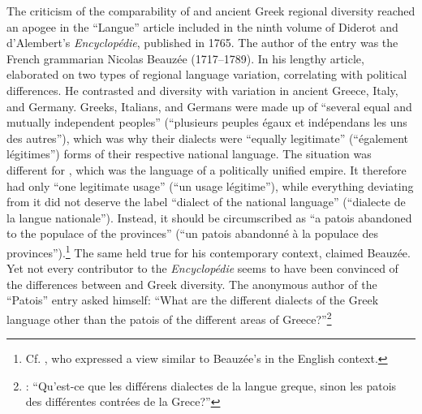 The criticism of the comparability of  and ancient Greek regional diversity reached an apogee in the “Langue” article included in the ninth volume of Diderot and d’Alembert’s \textit{Encyclopédie}, published in 1765. The author of the entry was the French grammarian Nicolas Beauzée (1717–1789). In his lengthy article, \citet[249]{Beauzee1765} elaborated on two types of regional language variation, correlating with political differences. He contrasted  and  diversity with variation in ancient Greece, Italy, and Germany. Greeks, Italians, and Germans were made up of “several equal and mutually independent peoples” (“plusieurs peuples égaux et indépendans les uns des autres”), which was why their dialects were “equally legitimate” (“également légitimes”) forms of their respective national language. The situation was different for , which was the language of a politically unified empire. It therefore had only “one legitimate usage” (“un usage légitime”), while everything deviating from it did not deserve the label “dialect of the national language” (“dialecte de la langue nationale”). Instead, it should be circumscribed as “a patois abandoned to the populace of the provinces” (“un patois abandonné à la populace des provinces”).\footnote{Cf. \citet[135--136]{Priestley1762}, who expressed a view similar to Beauzée’s in the English context.} The same held true for his contemporary  context, claimed Beauzée. Yet not every contributor to the \textit{Encyclopédie} seems to have been convinced of the differences between  and Greek diversity. The anonymous author of the “Patois” entry asked himself: “What are the different dialects of the Greek language other than the patois of the different areas of Greece?”\footnote{\citet[174]{Anon.1765}: “Qu’est-ce que les différens dialectes de la langue greque, sinon les patois des différentes contrées de la Grece?”}

